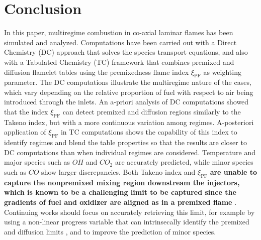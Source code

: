 \documentclass[preprint,12pt,authoryear]{elsarticle}
\begin{document}
{%






\section{Conclusion}
\label{sec:conclusion}

In this paper, multiregime combustion in co-axial laminar flames has been simulated and analyzed. Computations have been carried out with a Direct Chemistry (DC) approach that solves the species transport equations, and also with a Tabulated Chemistry (TC) framework that combines premixed and diffusion flamelet tables using the premixedness flame index $\xi_\mathrm{PF}$ as weighting parameter. The DC computations illustrate the multiregime nature of the cases, which vary depending on the relative proportion of fuel with respect to air being introduced through the inlets. An a-priori analysis of DC computations showed that the index $\xi_\mathrm{PF}$ can detect premixed and diffusion regions similarly to the Takeno index, but with a more continuous variation among regimes. A-posteriori application of $\xi_\mathrm{PF}$ in TC computations shows the capability of this index to identify regimes and blend the table properties so that the results are closer to DC computations than when individual regimes are considered. Temperature and major species such as $OH$ and $CO_2$ are accurately predicted, while minor species such as $CO$ show larger discrepancies. Both Takeno index and $\xi_\mathrm{PF}$ \textbf{are unable to capture the nonpremixed mixing region downstream the injectors, which is known to be a challenging limit to be captured since the gradients of fuel and oxidizer are aligned as in a premixed flame} \citep{novoselov_two-dimensional_2021}. Continuing works should focus on accurately retrieving this limit, for example by using a non-linear progress variable that can intrinsecally identify the premixed and diffusion limits \citep{novoselov_two-dimensional_2021}, and to improve the prediction of minor species.

}
\end{document}

